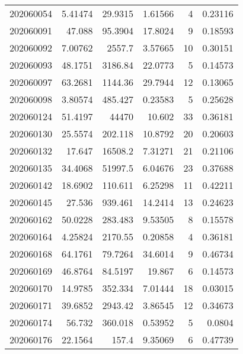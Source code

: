 \begin{tabular}{rrrrrr}
 202060054 &          5.41474 &       29.9315 &            1.61566 &           4 & 0.23116 \\
 202060091 &         47.088   &       95.3904 &           17.8024  &           9 & 0.18593 \\
 202060092 &          7.00762 &     2557.7    &            3.57665 &          10 & 0.30151 \\
 202060093 &         48.1751  &     3186.84   &           22.0773  &           5 & 0.14573 \\
 202060097 &         63.2681  &     1144.36   &           29.7944  &          12 & 0.13065 \\
 202060098 &          3.80574 &      485.427  &            0.23583 &           5 & 0.25628 \\
 202060124 &         51.4197  &    44470      &           10.602   &          33 & 0.36181 \\
 202060130 &         25.5574  &      202.118  &           10.8792  &          20 & 0.20603 \\
 202060132 &         17.647   &    16508.2    &            7.31271 &          21 & 0.21106 \\
 202060135 &         34.4068  &    51997.5    &            6.04676 &          23 & 0.37688 \\
 202060142 &         18.6902  &      110.611  &            6.25298 &          11 & 0.42211 \\
 202060145 &         27.536   &      939.461  &           14.2414  &          13 & 0.24623 \\
 202060162 &         50.0228  &      283.483  &            9.53505 &           8 & 0.15578 \\
 202060164 &          4.25824 &     2170.55   &            0.20858 &           4 & 0.36181 \\
 202060168 &         64.1761  &       79.7264 &           34.6014  &           9 & 0.46734 \\
 202060169 &         46.8764  &       84.5197 &           19.867   &           6 & 0.14573 \\
 202060170 &         14.9785  &      352.334  &            7.01444 &          18 & 0.03015 \\
 202060171 &         39.6852  &     2943.42   &            3.86545 &          12 & 0.34673 \\
 202060174 &         56.732   &      360.018  &            0.53952 &           5 & 0.0804  \\
 202060176 &         22.1564  &      157.4    &            9.35069 &           6 & 0.47739 \\

\end{tabular}
